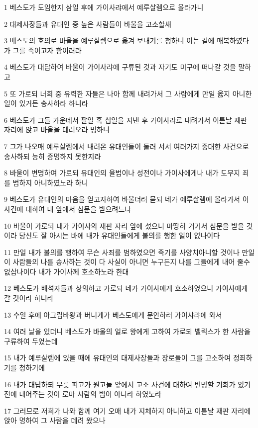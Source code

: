 \par 1 베스도가 도임한지 삼일 후에 가이사랴에서 예루살렘으로 올라가니
\par 2 대제사장들과 유대인 중 높은 사람들이 바울을 고소할새
\par 3 베스도의 호의로 바울을 예루살렘으로 옮겨 보내기를 청하니 이는 길에 매복하였다가 그를 죽이고자 함이러라
\par 4 베스도가 대답하여 바울이 가이사랴에 구류된 것과 자기도 미구에 떠나갈 것을 말하고
\par 5 또 가로되 너희 중 유력한 자들은 나아 함께 내려가서 그 사람에게 만일 옳지 아니한 일이 있거든 송사하라 하니라
\par 6 베스도가 그들 가운데서 팔일 혹 십일을 지낸 후 가이사랴로 내려가서 이튿날 재판 자리에 앉고 바울을 데려오라 명하니
\par 7 그가 나오매 예루살렘에서 내려온 유대인들이 둘러 서서 여러가지 중대한 사건으로 송사하되 능히 증명하지 못한지라
\par 8 바울이 변명하여 가로되 유대인의 율법이나 성전이나 가이사에게나 내가 도무지 죄를 범하지 아니하였노라 하니
\par 9 베스도가 유대인의 마음을 얻고자하여 바울더러 묻되 네가 예루살렘에 올라가서 이 사건에 대하여 내 앞에서 심문을 받으려느냐
\par 10 바울이 가로되 내가 가이사의 재판 자리 앞에 섰으니 마땅히 거기서 심문을 받을 것이라 당신도 잘 아시는 바에 내가 유대인들에게 불의를 행한 일이 없나이다
\par 11 만일 내가 불의를 행하여 무슨 사죄를 범하였으면 죽기를 사양치아니할 것이나 만일 이 사람들의 나를 송사하는 것이 다 사실이 아니면 누구든지 나를 그들에게 내어 줄수 없삽나이다 내가 가이사께 호소하노라 한대
\par 12 베스도가 배석자들과 상의하고 가로되 네가 가이사에게 호소하였으니 가이사에게 갈 것이라 하니라
\par 13 수일 후에 아그립바왕과 버니게가 베스도에게 문안하러 가이샤랴에 와서
\par 14 여러 날을 있더니 베스도가 바울의 일로 왕에게 고하여 가로되 벨릭스가 한 사람을 구류하여 두었는데
\par 15 내가 예루살렘에 있을 때에 유대인의 대제사장들과 장로들이 그를 고소하여 정죄하기를 청하기에
\par 16 내가 대답하되 무릇 피고가 원고들 앞에서 고소 사건에 대하여 변명할 기회가 있기 전에 내어주는 것이 로마 사람의 법이 아니라 하였노라
\par 17 그러므로 저희가 나와 함께 여기 오매 내가 지체하지 아니하고 이튿날 재판 자리에 앉아 명하여 그 사람을 데려 왔으나
